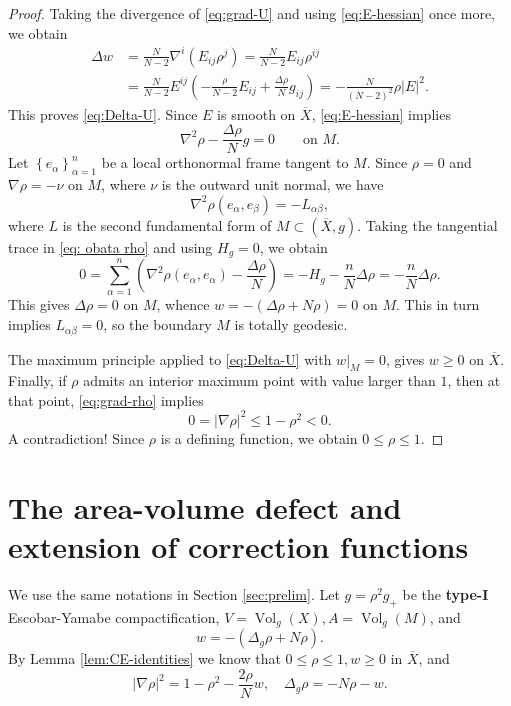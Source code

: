 \documentclass[11pt,letterpaper]{amsart}
\theoremstyle{definition}
\theoremstyle{remark}
\numberwithin{equation}{section}
\newcommand{\barX}{\overline X}
\begin{document}
\begin{proof}
Taking the divergence of \eqref{eq:grad-U} and using \eqref{eq:E-hessian} once more, we obtain
\[
\begin{aligned}
        \Delta w
        &= \frac{N}{N-2}\nabla^i(E_{ij}\rho^j)
         = \frac{N}{N-2}E_{ij}\rho^{ij}\\
        &= \frac{N}{N-2}E^{ij}\left(-\frac{\rho}{N-2}E_{ij}+\frac{\Delta\rho}{N}g_{ij}\right)
         =-\frac{N}{(N-2)^2}\rho |E|^2.
\end{aligned}
\]
 This proves \eqref{eq:Delta-U}.
 Since $E$ is smooth on $\barX$,  \eqref{eq:E-hessian} implies
\begin{equation}\label{eq: obata rho}
 \nabla^2\rho-\frac{\Delta\rho}{N}g=0
        \qquad\text{on }M.
\end{equation}
Let $\left\{e_\alpha\right\}_{\alpha=1}^n$ be a local orthonormal frame tangent to $M$. Since $\rho=0$ and $\nabla \rho=-\nu$ on $M$, where $\nu$ is the outward unit normal, we have
\[
\nabla^2 \rho\left(e_\alpha, e_\beta\right)=-L_{\alpha \beta},
\]
where $L$ is the second fundamental form of $M \subset (\barX, g)$. Taking the tangential trace in \eqref{eq: obata rho} and using $H_g=0$, we obtain
\[
0=\sum_{\alpha=1}^n\left(\nabla^2 \rho\left(e_\alpha, e_\alpha\right)-\frac{\Delta \rho}{N}\right)=-H_g-\frac{n}{N} \Delta \rho=-\frac{n}{N} \Delta \rho.
\]
This gives $\Delta \rho=0$ on $M$, whence $w=-(\Delta \rho+N \rho)=0$ on $M$. This in turn implies $L_{\alpha \beta}=0$, so the boundary $M$ is totally geodesic.

The maximum principle applied to \eqref{eq:Delta-U} with $\left.w\right|_M=0$, gives $w \geq 0$ on $\barX$. 
Finally, if $\rho$ admits an interior maximum point with value larger than $1$, then at that point, \eqref{eq:grad-rho} implies
\[
        0=|\nabla\rho|^2\le1-\rho^2<0.
\]
A contradiction! Since $\rho$ is a defining function, we obtain $0 \le \rho \le 1$.
\end{proof}


\section{The area-volume defect and extension of correction functions}\label{sec:defect}
We use the same notations in Section \ref{sec:prelim}. Let $g=\rho^2 g_{+}$ be the \textbf{type-I} Escobar-Yamabe compactification, $V=\operatorname{Vol}_g(X), A=\operatorname{Vol}_g(M)$, and
\[w=-\left(\Delta_g \rho+N \rho\right) .\]
By  Lemma \ref{lem:CE-identities} we know that $0 \leq \rho \leq 1, w \geq 0$ in $\overline X$, and
\[|\nabla \rho|^2=1-\rho^2-\frac{2 \rho}{N} w, \quad \Delta_g \rho=-N \rho-w.\]
\end{document}
